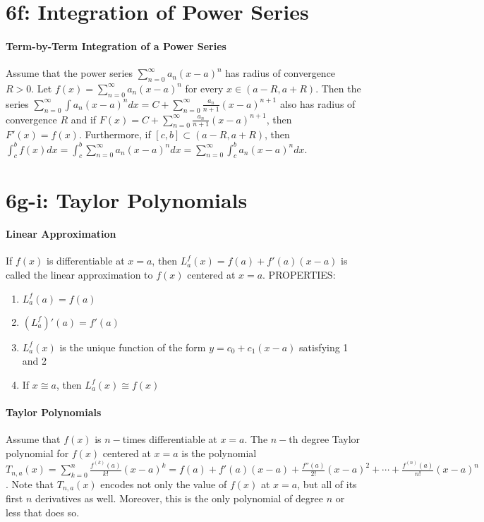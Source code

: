 \documentclass[10pt,letter]{article}
\begin{document}
\section*{6f: Integration of Power Series}
\paragraph{Term-by-Term Integration of a Power Series}
Assume that the power series $\sum_{n=0}^\infty a_n(x-a)^n$ has radius of convergence $R>0$. Let $f(x)=\sum_{n=0}^\infty a_n(x-a)^n$ for every $x\in(a-R,a+R)$. Then the series $\sum_{n=0}^\infty\int a_n(x-a)^ndx=C+\sum_{n=0}^\infty\frac{a_n}{n+1}(x-a)^{n+1}$ also has radius of convergence $R$ and if $F(x)=C+\sum_{n=0}^\infty\frac{a_n}{n+1}(x-a)^{n+1}$, then $F'(x)=f(x)$. Furthermore, if $[c,b]\subset (a-R,a+R)$, then $\int_c^bf(x)dx=\int_c^b\sum_{n=0}^\infty a_n(x-a)^ndx=\sum_{n=0}^\infty\int_c^b a_n(x-a)^ndx$. 

\section*{6g-i: Taylor Polynomials}
\paragraph{Linear Approximation}
If $f(x)$ is differentiable at $x=a$, then $L_a^f(x)=f(a)+f'(a)(x-a)$ is called the linear approximation to $f(x)$ centered at $x=a$. PROPERTIES:
\begin{enumerate}
    \item $L_a^f(a)=f(a)$ 
    \item $(L_a^f)'(a)=f'(a)$
    \item $L_a^f(x)$ is the unique function of the form $y=c_0+c_1(x-a)$ satisfying 1 and 2 
    \item If $x\cong a$, then $L_a^f(x)\cong f(x)$
\end{enumerate}
\paragraph{Taylor Polynomials}
Assume that $f(x)$ is $n-$times differentiable at $x=a$. The $n-$th degree Taylor polynomial for $f(x)$ centered at $x=a$ is the polynomial $T_{n,a}(x)=\sum_{k=0}^n\frac{f^{(k)}(a)}{k!}(x-a)^k=f(a)+f'(a)(x-a)+\frac{f''(a)}{2!}(x-a)^2+\cdots+\frac{f^{(n)}(a)}{n!}(x-a)^n$. Note that $T_{n,a}(x)$ encodes not only the value of $f(x)$ at $x=a$, but all of its first $n$ derivatives as well. Moreover, this is the only polynomial of degree $n$ or less that does so. 
\end{document}
